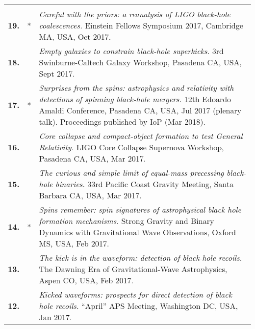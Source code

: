 \documentclass[letterpaper]{moderncv}
\begin{document}
{\begin{longtable}{rp{0.4cm}p{15.8cm}}
\vspace{0.05cm}\\
%
\textbf{19.} & * & \textit{Careful with the priors: a reanalysis of LIGO black-hole coalescences.}
\newline{} Einstein Fellows Symposium 2017, Cambridge MA, USA, Oct 2017.
\vspace{0.05cm}\\
%
\textbf{18.} & & \textit{Empty galaxies to constrain black-hole superkicks.}
\newline{} 3rd Swinburne-Caltech Galaxy Workshop, Pasadena CA, USA, Sept 2017.
\vspace{0.05cm}\\
%
\textbf{17.} & * & \textit{Surprises from the spins: astrophysics and relativity with detections of spinning black-hole mergers.}
\newline{}12th Edoardo Amaldi Conference, Pasadena CA, USA, Jul 2017 (plenary talk).
\newline{}Proceedings published by IoP (Mar 2018).
\vspace{0.05cm}\\
%
\textbf{16.} & & \textit{Core collapse and compact-object formation to test General Relativity.}
\newline{}LIGO Core Collapse Supernova Workshop, Pasadena CA, USA, Mar 2017.
\vspace{0.05cm}\\
%
\textbf{15.} & & \textit{The curious and simple limit of equal-mass precessing black-hole binaries.}
\newline{}33rd Pacific Coast Gravity Meeting, Santa Barbara CA, USA, Mar 2017.
\vspace{0.05cm}\\
%
\textbf{14.} & * & \textit{Spins remember: spin signatures of astrophysical black hole formation mechanisms.}
\newline{}Strong Gravity and Binary Dynamics with Gravitational Wave Observations, Oxford MS, USA, Feb 2017.
\vspace{0.05cm}\\
%
\textbf{13.} & & \textit{The kick is in the waveform: detection of black-hole recoils.}
\newline{}The Dawning Era of Gravitational-Wave Astrophysics, Aspen CO, USA, Feb 2017.
\vspace{0.05cm}\\
%
\textbf{12.} & & \textit{Kicked waveforms: prospects for direct detection of black hole recoils.}
\newline{}``April'' APS Meeting, Washington DC, USA, Jan 2017.

\end{longtable}}
\end{document}
